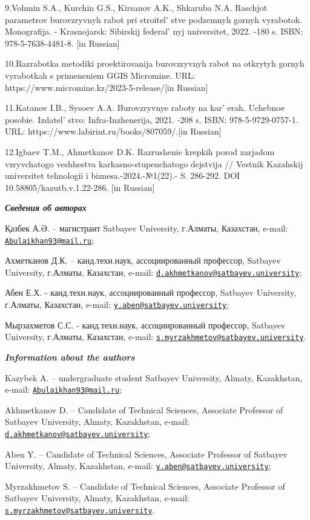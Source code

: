 \begin{references}
9.Vohmin S.A., Kurchin G.S., Kirsanov A.K., Shkaruba N.A. Raschjot
parametrov burovzryvnyh rabot pri stroitel' stve
podzemnyh gornyh vyrabotok. Monografija. - Krasnojarsk: Sibirskij
federal' nyj universitet, 2022. -180 s. ISBN: 978-5-7638-4481-8. {[}in Russian{]}

10.Razrabotka metodiki proektirovanija burovzryvnyh rabot na otkrytyh
gornyh vyrabotkah s primeneniem GGIS Micromine. URL: https://www.micromine.kz/2023-5-release/{[}in Russian{]}

11.Katanov I.B., Sysoev A.A. Burovzryvnye raboty na
kar' erah. Uchebnoe posobie.
Izdatel' stvo: Infra-Inzhenerija, 2021. -208 s. ISBN:
978-5-9729-0757-1. URL: https://www.labirint.ru/books/807059/.{[}in Russian{]}

12.Igbaev T.M., Ahmetkanov D.K. Razrushenie krepkih porod zarjadom
vzryvchatogo veshhestva karkasno-stupenchatogo dejstvija // Vestnik
Kazahskij universitet tehnologii i biznesa.-2024.-№1(22).- S. 286-292.
DOI 10.58805/kazutb.v.1.22-286. {[}in Russian{]}
\end{references}
\begin{authorinfo}

\hspace{1em}\emph{{\bfseries Сведения об авторах}}

Қазбек А.Ә. -- магистрант Satbayev University, г.Алматы, Казахстан,
e-mail:
\href{mailto:Abulaikhan93@mail.ru}{\nolinkurl{Abulaikhan93@mail.ru}};

Ахметканов Д.К. -- канд.техн.наук, ассоциированный профессор, Satbayev
University, г.Алматы, Казахстан, e-mail:
\href{mailto:d.akhmetkanov@satbayev.university}{\nolinkurl{d.akhmetkanov@satbayev.university}};

Абен Е.Х. - канд.техн.наук, ассоциированный профессор, Satbayev
University, г.Алматы, Казахстан, e-mail:
\href{mailto:y.aben@satbayev.university}{\nolinkurl{y.aben@satbayev.university}};

Мырзахметов С.С. - канд.техн.наук, ассоциированный профессор, Satbayev
University, г.Алматы, Казахстан, e-mail:
\href{mailto:s.myrzakhmetov@satbayev.university}{\nolinkurl{s.myrzakhmetov@satbayev.university}}.

\hspace{1em}\emph{{\bfseries Information about the authors}}

Kazybek A. -- undergraduate student Satbayev University, Almaty,
Kazakhstan, e-mail:
\href{mailto:Abulaikhan93@mail.ru}{\nolinkurl{Abulaikhan93@mail.ru}};

Akhmetkanov D. -- Candidate of Technical Sciences, Associate Professor
of Satbayev University, Almaty, Kazakhstan, e-mail:
\href{mailto:d.akhmetkanov@satbayev.university}{\nolinkurl{d.akhmetkanov@satbayev.university}};

Aben Y. -- Candidate of Technical Sciences, Associate Professor of
Satbayev University, Almaty, Kazakhstan, e-mail:
\href{mailto:y.aben@satbayev.university}{\nolinkurl{y.aben@satbayev.university}};

Myrzakhmetov S. -- Candidate of Technical Sciences, Associate Professor
of Satbayev University, Almaty, Kazakhstan, e-mail:
\href{mailto:s.myrzakhmetov@satbayev.university}{\nolinkurl{s.myrzakhmetov@satbayev.university}}.
\end{authorinfo}
